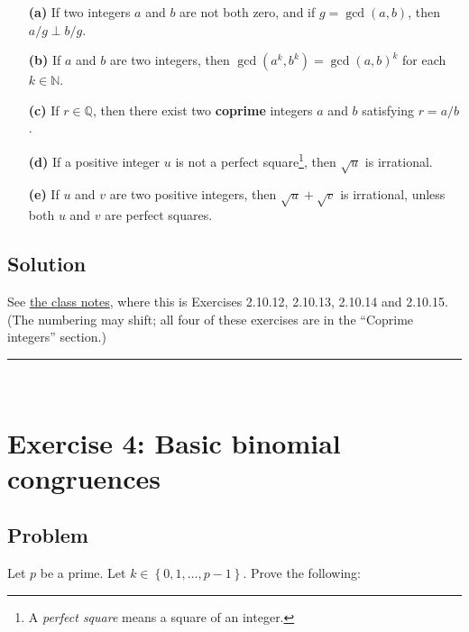 \documentclass[paper=a4, fontsize=12pt]{scrartcl} %
\newcommand{\QQ}{\mathbb{Q}} %
\newcommand{\NN}{\mathbb{N}} %
\newcommand{\set}[1]{\left\{ #1 \right\}}
\newcommand{\tup}[1]{\left( #1 \right)}
\newcommand{\horrule}[1]{\rule{\linewidth}{#1}} %
\theoremstyle{plainsl}
\theoremstyle{definition}
\theoremstyle{remark}
\begin{document}
\begin{enumerate}

\item[\textbf{(a)}]
If two integers $a$ and $b$ are not both zero, and
if $g = \gcd\tup{a, b}$, then $a/g \perp b/g$.

\item[\textbf{(b)}]
If $a$ and $b$ are two integers, then
$\gcd\tup{a^k, b^k} = \gcd\tup{a, b}^k$ for each
$k \in \NN$.

\item[\textbf{(c)}]
If $r \in \QQ$, then there exist two \textbf{coprime}
integers $a$ and $b$ satisfying $r = a/b$.

\item[\textbf{(d)}]
If a positive integer $u$ is not a perfect
square\footnote{A \textit{perfect square} means a square
of an integer.},
then $\sqrt{u}$ is irrational.

\item[\textbf{(e)}]
If $u$ and $v$ are two positive integers,
then $\sqrt{u} + \sqrt{v}$ is irrational,
unless both $u$ and $v$ are perfect squares.

\end{enumerate}

\subsection{Solution}

See
\href{http://www-users.math.umn.edu/~dgrinber/19s/notes.pdf}{the class notes},
where this is Exercises 2.10.12, 2.10.13, 2.10.14 and 2.10.15.
(The numbering may shift; all four of these exercises are in the
``Coprime integers''
section.)

\horrule{0.3pt} \\[0.4cm]

\section{Exercise 4: Basic binomial congruences}

\subsection{Problem}

Let $p$ be a prime.
Let $k \in \set{0, 1, \ldots, p-1}$.
Prove the following:
\end{document}

